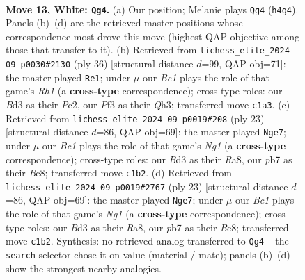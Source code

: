 \documentclass[11pt]{article}
\begin{document}
\clearpage

\begin{figure}[p]\centering
\begin{subfigure}{0.46\textwidth}\centering
\resizebox{\linewidth}{!}{%
\newchessgame
\chessboard[
  setfen={r1b1k2r/pp1nbppp/2n1p3/3pP3/1q1P3Q/3B1PP1/P2N3P/R1B1K1NR w KQ - 0 13},
  showmover=false,
  pgfstyle=straightmove, color=movearrow, markmove={h4-g4}
]}
\caption{}
\end{subfigure}\hfill
\begin{subfigure}{0.46\textwidth}\centering
\resizebox{\linewidth}{!}{%
\newchessgame
\chessboard[
  setfen={r6r/1ppbkpp1/n3p2p/pBb1P3/8/P3qN1Q/1PPN2PP/R2K3R w - - 4 19},
  showmover=false,
  pgfstyle=straightmove, color=movearrow, markmove={h1-e1}
]}
\caption{}
\end{subfigure}
\\[4pt]
\begin{subfigure}{0.46\textwidth}\centering
\resizebox{\linewidth}{!}{%
\newchessgame
\chessboard[
  setfen={r1b1k1nr/pp3ppp/1qnbp3/3pN3/3P1P2/1QPBB3/PP1N2PP/R3K2R b KQkq - 4 12},
  showmover=false,
  pgfstyle=straightmove, color=movearrow, markmove={g8-e7}
]}
\caption{}
\end{subfigure}\hfill
\begin{subfigure}{0.46\textwidth}\centering
\resizebox{\linewidth}{!}{%
\newchessgame
\chessboard[
  setfen={r1b1k1nr/pp3ppp/1qnbp3/3pN3/3P1P2/1QPBB3/PP1N2PP/R3K2R b KQkq - 4 12},
  showmover=false,
  pgfstyle=straightmove, color=movearrow, markmove={g8-e7}
]}
\caption{}
\end{subfigure}
\caption{\textbf{Move 13, White: \texttt{Qg4}.} (a) Our position; Melanie plays \texttt{Qg4} (\texttt{h4g4}). Panels (b)--(d) are the retrieved master positions whose correspondence most drove this move (highest QAP objective among those that transfer to it). (b) Retrieved from \texttt{lichess\_elite\_2024-09\_p0030\#2130} (ply 36) [structural distance $d$=99, QAP obj=71]: the master played \texttt{Re1}; under $\mu$ our \emph{Bc1} plays the role of that game's \emph{Rh1} (a \textbf{cross-type} correspondence); cross-type roles: our \emph{B}d3 as their \emph{P}c2, our \emph{P}f3 as their \emph{Q}h3; transferred move \texttt{c1a3}. (c) Retrieved from \texttt{lichess\_elite\_2024-09\_p0019\#208} (ply 23) [structural distance $d$=86, QAP obj=69]: the master played \texttt{Nge7}; under $\mu$ our \emph{Bc1} plays the role of that game's \emph{Ng1} (a \textbf{cross-type} correspondence); cross-type roles: our \emph{B}d3 as their \emph{R}a8, our \emph{p}b7 as their \emph{B}c8; transferred move \texttt{c1b2}. (d) Retrieved from \texttt{lichess\_elite\_2024-09\_p0019\#2767} (ply 23) [structural distance $d$=86, QAP obj=69]: the master played \texttt{Nge7}; under $\mu$ our \emph{Bc1} plays the role of that game's \emph{Ng1} (a \textbf{cross-type} correspondence); cross-type roles: our \emph{B}d3 as their \emph{R}a8, our \emph{p}b7 as their \emph{B}c8; transferred move \texttt{c1b2}. Synthesis: no retrieved analog transferred to \texttt{Qg4} -- the \texttt{search} selector chose it on value (material / mate); panels (b)--(d) show the strongest nearby analogies.}
\label{fig:thought-m24}
\end{figure}
\end{document}
